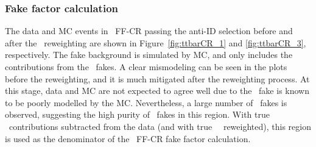 \subsubsection{Fake factor calculation}
The data and MC events in \ttbar\ FF-CR passing the anti-ID selection 
before and after the \ttbar\ reweighting 
are shown in Figure~\ref{fig:ttbarCR_1} and \ref{fig:ttbarCR_3}, respectively.
The fake background is simulated by MC, and only includes 
the contributions from the \ttbar\ fakes. 
A clear mismodeling can be seen in the plots before 
the reweighting, and it is much mitigated after the 
reweighting process. At this stage, data and MC are 
not expected to agree well due to the \ttbar\ fake is known to
be poorly modelled by the MC. 
Nevertheless, a large number of \ttbar\ fakes is observed, suggesting
the high purity of \ttbar\ fakes in this region. 
With true \tauhad\ contributions subtracted from the data 
(and with true \tauhad\ \ttbar\ reweighted),  
this region is used as the denominator of the \ttbar\ FF-CR fake factor calculation. 




